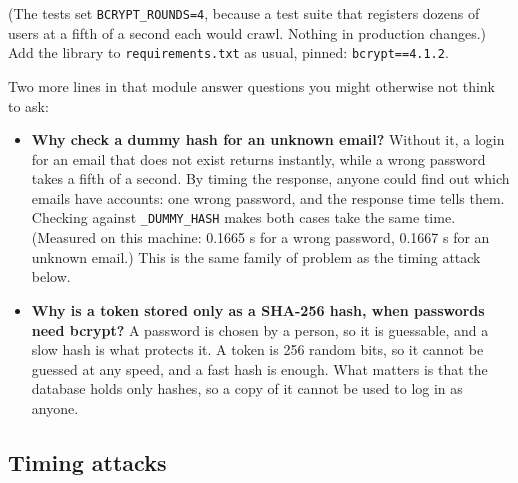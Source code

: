 \begin{codebox}[short]

\begin{Shaded}
\begin{Highlighting}[]
 \OperatorTok{=} \NormalTok{, }\NormalTok{))}
\end{Highlighting}
\end{Shaded}

\end{codebox}

\noindent{}(The tests set \texttt{BCRYPT\_ROUNDS=4}, because a test suite that registers dozens of users at a fifth of a second each would crawl. Nothing in production changes.) Add the library to \texttt{requirements.txt} as usual, pinned: \texttt{bcrypt==4.1.2}.

Two more lines in that module answer questions you might otherwise not think to ask:

\begin{itemize}
\tightlist
\item
  \textbf{Why check a dummy hash for an unknown email?} Without it, a login for an email that does not exist returns instantly, while a wrong password takes a fifth of a second. By timing the response, anyone could find out which emails have accounts: one wrong password, and the response time tells them. Checking against \texttt{\_DUMMY\_HASH} makes both cases take the same time. (Measured on this machine: 0.1665 s for a wrong password, 0.1667 s for an unknown email.) This is the same family of problem as the timing attack below.
\item
  \textbf{Why is a token stored only as a SHA-256 hash, when passwords need bcrypt?} A password is chosen by a person, so it is guessable, and a slow hash is what protects it. A token is 256 random bits, so it cannot be guessed at any speed, and a fast hash is enough. What matters is that the database holds only hashes, so a copy of it cannot be used to log in as anyone.
\end{itemize}

\subsection*{Timing attacks}\label{38-security:timing-attacks}

